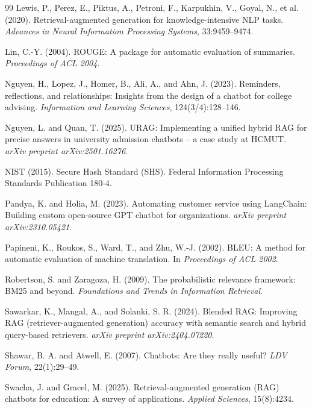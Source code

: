 \documentclass[a4paper,twoside]{article}
\begin{document}
{\begin{thebibliography}{99}
 Lewis, P., Perez, E., Piktus, A., Petroni, F., Karpukhin, V., Goyal, N., et al. (2020). Retrieval-augmented generation for knowledge-intensive NLP tasks. \textit{Advances in Neural Information Processing Systems}, 33:9459--9474.

 Lin, C.-Y. (2004). ROUGE: A package for automatic evaluation of summaries. \textit{Proceedings of ACL 2004}.

 Nguyen, H., Lopez, J., Homer, B., Ali, A., and Ahn, J. (2023). Reminders, reflections, and relationships: Insights from the design of a chatbot for college advising. \textit{Information and Learning Sciences}, 124(3/4):128--146.

 Nguyen, L. and Quan, T. (2025). URAG: Implementing a unified hybrid RAG for precise answers in university admission chatbots -- a case study at HCMUT. \textit{arXiv preprint arXiv:2501.16276}.

 NIST (2015). Secure Hash Standard (SHS). Federal Information Processing Standards Publication 180-4.

 Pandya, K. and Holia, M. (2023). Automating customer service using LangChain: Building custom open-source GPT chatbot for organizations. \textit{arXiv preprint arXiv:2310.05421}.

 Papineni, K., Roukos, S., Ward, T., and Zhu, W.-J. (2002). BLEU: A method for automatic evaluation of machine translation. In \textit{Proceedings of ACL 2002}.

 Robertson, S. and Zaragoza, H. (2009). The probabilistic relevance framework: BM25 and beyond. \textit{Foundations and Trends in Information Retrieval}.

 Sawarkar, K., Mangal, A., and Solanki, S. R. (2024). Blended RAG: Improving RAG (retriever-augmented generation) accuracy with semantic search and hybrid query-based retrievers. \textit{arXiv preprint arXiv:2404.07220}.

 Shawar, B. A. and Atwell, E. (2007). Chatbots: Are they really useful? \textit{LDV Forum}, 22(1):29--49.

 Swacha, J. and Gracel, M. (2025). Retrieval-augmented generation (RAG) chatbots for education: A survey of applications. \textit{Applied Sciences}, 15(8):4234.


\end{thebibliography}}
\end{document}

